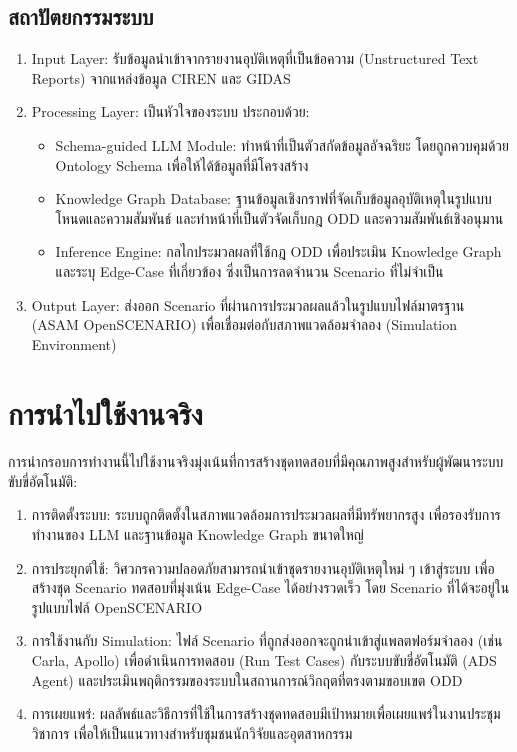 \subsection{สถาปัตยกรรมระบบ}\label{subsec:ch4_architecture}

\begin{enumerate}
    \item Input Layer: รับข้อมูลนำเข้าจากรายงานอุบัติเหตุที่เป็นข้อความ (Unstructured Text Reports) จากแหล่งข้อมูล CIREN และ GIDAS
    \item Processing Layer: เป็นหัวใจของระบบ ประกอบด้วย:
    \begin{itemize}
        \item Schema-guided LLM Module: ทำหน้าที่เป็นตัวสกัดข้อมูลอัจฉริยะ โดยถูกควบคุมด้วย Ontology Schema เพื่อให้ได้ข้อมูลที่มีโครงสร้าง
        \item Knowledge Graph Database: ฐานข้อมูลเชิงกราฟที่จัดเก็บข้อมูลอุบัติเหตุในรูปแบบโหนดและความสัมพันธ์ และทำหน้าที่เป็นตัวจัดเก็บกฎ ODD และความสัมพันธ์เชิงอนุมาน
        \item Inference Engine: กลไกประมวลผลที่ใช้กฎ ODD เพื่อประเมิน Knowledge Graph และระบุ Edge-Case ที่เกี่ยวข้อง ซึ่งเป็นการลดจำนวน Scenario ที่ไม่จำเป็น
    \end{itemize}
    \item Output Layer: ส่งออก Scenario ที่ผ่านการประมวลผลแล้วในรูปแบบไฟล์มาตรฐาน (ASAM OpenSCENARIO) เพื่อเชื่อมต่อกับสภาพแวดล้อมจำลอง (Simulation Environment)
\end{enumerate}

\section{การนำไปใช้งานจริง}\label{sec:ch4_deployment}
\paragraph{}

การนำกรอบการทำงานนี้ไปใช้งานจริงมุ่งเน้นที่การสร้างชุดทดสอบที่มีคุณภาพสูงสำหรับผู้พัฒนาระบบขับขี่อัตโนมัติ:

\begin{enumerate}
    \item การติดตั้งระบบ: ระบบถูกติดตั้งในสภาพแวดล้อมการประมวลผลที่มีทรัพยากรสูง เพื่อรองรับการทำงานของ LLM และฐานข้อมูล Knowledge Graph ขนาดใหญ่
    \item การประยุกต์ใช้: วิศวกรความปลอดภัยสามารถนำเข้าชุดรายงานอุบัติเหตุใหม่ ๆ เข้าสู่ระบบ เพื่อสร้างชุด Scenario ทดสอบที่มุ่งเน้น Edge-Case ได้อย่างรวดเร็ว โดย Scenario ที่ได้จะอยู่ในรูปแบบไฟล์ OpenSCENARIO
    \item การใช้งานกับ Simulation: ไฟล์ Scenario ที่ถูกส่งออกจะถูกนำเข้าสู่แพลตฟอร์มจำลอง (เช่น Carla, Apollo) เพื่อดำเนินการทดสอบ (Run Test Cases) กับระบบขับขี่อัตโนมัติ (ADS Agent) และประเมินพฤติกรรมของระบบในสถานการณ์วิกฤตที่ตรงตามขอบเขต ODD
    \item การเผยแพร่: ผลลัพธ์และวิธีการที่ใช้ในการสร้างชุดทดสอบมีเป้าหมายเพื่อเผยแพร่ในงานประชุมวิชาการ เพื่อให้เป็นแนวทางสำหรับชุมชนนักวิจัยและอุตสาหกรรม
\end{enumerate}

